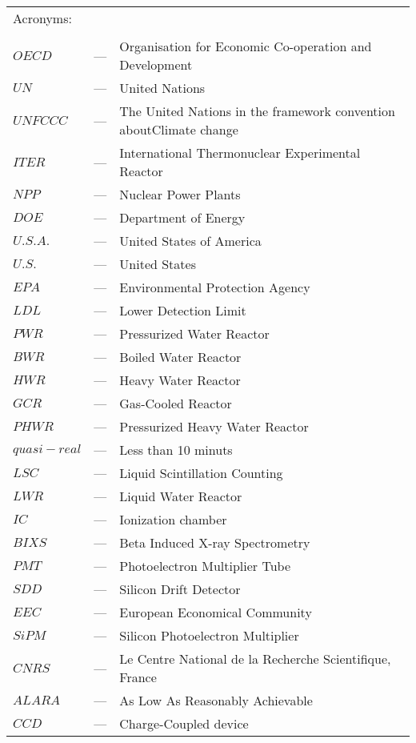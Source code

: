 \begin{longtable}{p{25mm} c p{120mm} }
\multicolumn{3}{l}{Acronyms:}\\
\\
$OECD$ & --- & Organisation for Economic Co-operation and Development\\
$UN$ & --- & United Nations\\
$UNFCCC$ & --- & The United Nations in the framework convention about\newline Climate change\\
$ITER$ & --- & International Thermonuclear Experimental Reactor\\
$NPP$ & --- & Nuclear Power Plants\\
$DOE$ & --- & Department of Energy\\
$U.S.A.$ & --- & United States of America\\
$U.S.$ & --- & United States\\
$EPA$ & --- & Environmental Protection Agency\\
$LDL$ & --- & Lower Detection Limit\\
$PWR$ & --- & Pressurized Water Reactor\\
$BWR$ & --- & Boiled Water Reactor\\
$HWR$ & --- & Heavy Water Reactor\\
$GCR$ & --- & Gas-Cooled Reactor\\
$PHWR$ & --- & Pressurized Heavy Water Reactor\\
$quasi-real$ & --- & Less than 10 minuts\\
$LSC$ & --- & Liquid Scintillation Counting\\
$LWR$ & --- & Liquid Water Reactor\\
$IC$ & --- & Ionization chamber\\
$BIXS$ & --- & Beta Induced X-ray Spectrometry\\
$PMT$ & --- & Photoelectron Multiplier Tube\\
$SDD$ & --- & Silicon Drift Detector\\
$EEC$ & --- & European Economical Community\\
$SiPM$ & --- & Silicon Photoelectron Multiplier\\
$CNRS$ & --- & Le Centre National de la Recherche Scientifique, France\\
$ALARA$ & --- & As Low As Reasonably Achievable\\
$CCD$ & --- & Charge-Coupled device\\


\end{longtable}
